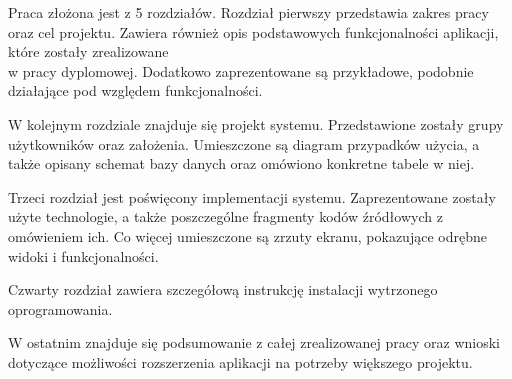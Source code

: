 \documentclass[10pt,titlepage]{article}
\begin{document}
\par Praca złożona jest z 5 rozdziałów. Rozdział pierwszy przedstawia zakres pracy oraz cel projektu. Zawiera również opis podstawowych funkcjonalności aplikacji, które zostały zrealizowane\\ w pracy dyplomowej. Dodatkowo zaprezentowane są przykładowe, podobnie działające pod względem funkcjonalności.
\par W kolejnym rozdziale znajduje się projekt systemu. Przedstawione zostały grupy użytkowników oraz założenia. Umieszczone są diagram przypadków użycia, a także opisany schemat bazy danych oraz omówiono konkretne tabele w niej.
\par Trzeci rozdział jest poświęcony implementacji systemu. Zaprezentowane zostały użyte technologie, a także poszczególne fragmenty kodów źródłowych z omówieniem ich. Co więcej umieszczone są zrzuty ekranu, pokazujące odrębne widoki i funkcjonalności.
\par Czwarty rozdział zawiera szczegółową instrukcję instalacji wytrzonego oprogramowania.
\par W ostatnim znajduje się podsumowanie z całej zrealizowanej pracy oraz wnioski dotyczące możliwości rozszerzenia aplikacji na potrzeby większego projektu.
\end{document}
